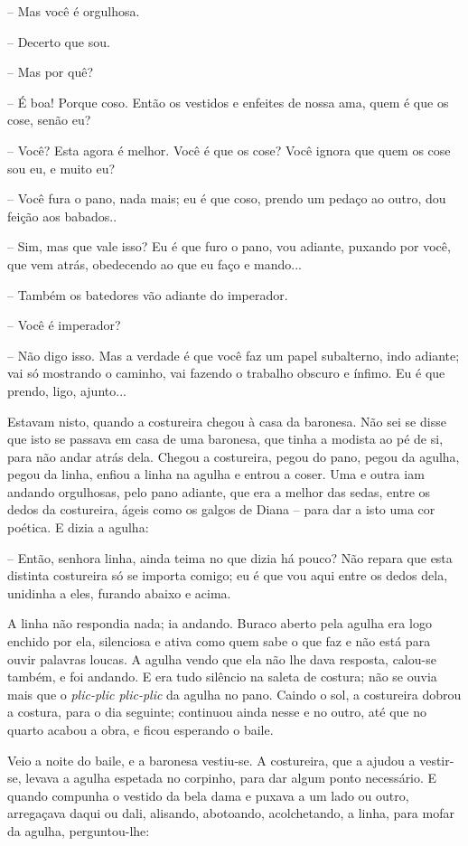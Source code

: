 -- Mas você é orgulhosa.

-- Decerto que sou.

-- Mas por quê?

-- É boa! Porque coso. Então os vestidos e enfeites de nossa ama, quem é
que os cose, senão eu?

-- Você? Esta agora é melhor. Você é que os cose? Você ignora que quem
os cose sou eu, e muito eu?

-- Você fura o pano, nada mais; eu é que coso, prendo um pedaço ao
outro, dou feição aos babados..

-- Sim, mas que vale isso? Eu é que furo o pano, vou adiante, puxando
por você, que vem atrás, obedecendo ao que eu faço e mando...

-- Também os batedores vão adiante do imperador.

-- Você é imperador?

-- Não digo isso. Mas a verdade é que você faz um papel subalterno, indo
adiante; vai só mostrando o caminho, vai fazendo o trabalho obscuro e
ínfimo. Eu é que prendo, ligo, ajunto...

Estavam nisto, quando a costureira chegou à casa da baronesa. Não sei se
disse que isto se passava em casa de uma baronesa, que tinha a modista
ao pé de si, para não andar atrás dela. Chegou a costureira, pegou do
pano, pegou da agulha, pegou da linha, enfiou a linha na agulha e entrou
a coser. Uma e outra iam andando orgulhosas, pelo pano adiante, que era
a melhor das sedas, entre os dedos da costureira, ágeis como os galgos
de Diana -- para dar a isto uma cor poética. E dizia a agulha:

-- Então, senhora linha, ainda teima no que dizia há pouco? Não repara
que esta distinta costureira só se importa comigo; eu é que vou aqui
entre os dedos dela, unidinha a eles, furando abaixo e acima.

A linha não respondia nada; ia andando. Buraco aberto pela agulha era
logo enchido por ela, silenciosa e ativa como quem sabe o que faz e não
está para ouvir palavras loucas. A agulha vendo que ela não lhe dava
resposta, calou-se também, e foi andando. E era tudo silêncio na saleta
de costura; não se ouvia mais que o \emph{plic-plic plic-plic} da agulha
no pano. Caindo o sol, a costureira dobrou a costura, para o dia
seguinte; continuou ainda nesse e no outro, até que no quarto acabou a
obra, e ficou esperando o baile.

Veio a noite do baile, e a baronesa vestiu-se. A costureira, que a
ajudou a vestir-se, levava a agulha espetada no corpinho, para dar algum
ponto necessário. E quando compunha o vestido da bela dama e puxava a um
lado ou outro, arregaçava daqui ou dali, alisando, abotoando,
acolchetando, a linha, para mofar da agulha, perguntou-lhe:

